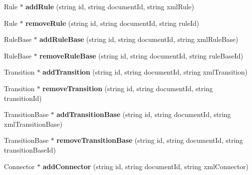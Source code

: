 \begin{CompactItemize}
\item 
Rule $\ast$ \textbf{addRule} (string id, string documentId, string xmlRule)\label{classbr_1_1pucrio_1_1telemidia_1_1ginga_1_1ncl_1_1PrivateBaseManager_79686d3529572c6b1bc7ced153141581}

\item 
Rule $\ast$ \textbf{removeRule} (string id, string documentId, string ruleId)\label{classbr_1_1pucrio_1_1telemidia_1_1ginga_1_1ncl_1_1PrivateBaseManager_5304dbb09b3486561432bc28a0765f1d}

\item 
RuleBase $\ast$ \textbf{addRuleBase} (string id, string documentId, string xmlRuleBase)\label{classbr_1_1pucrio_1_1telemidia_1_1ginga_1_1ncl_1_1PrivateBaseManager_7898de4378082126311f97e424f409e9}

\item 
RuleBase $\ast$ \textbf{removeRuleBase} (string id, string documentId, string ruleBaseId)\label{classbr_1_1pucrio_1_1telemidia_1_1ginga_1_1ncl_1_1PrivateBaseManager_7cd319df35fd4483f3f3a5ec513059cb}

\item 
Transition $\ast$ \textbf{addTransition} (string id, string documentId, string xmlTransition)\label{classbr_1_1pucrio_1_1telemidia_1_1ginga_1_1ncl_1_1PrivateBaseManager_d216f9c36ddeb8a161967a0f1110cf38}

\item 
Transition $\ast$ \textbf{removeTransition} (string id, string documentId, string transitionId)\label{classbr_1_1pucrio_1_1telemidia_1_1ginga_1_1ncl_1_1PrivateBaseManager_6abd20afd59843f960860a7ee88aa6a6}

\item 
TransitionBase $\ast$ \textbf{addTransitionBase} (string id, string documentId, string xmlTransitionBase)\label{classbr_1_1pucrio_1_1telemidia_1_1ginga_1_1ncl_1_1PrivateBaseManager_2e02df843e0c193a0db734c60b2a131b}

\item 
TransitionBase $\ast$ \textbf{removeTransitionBase} (string id, string documentId, string transitionBaseId)\label{classbr_1_1pucrio_1_1telemidia_1_1ginga_1_1ncl_1_1PrivateBaseManager_c2e27eb224730dab166f0fb29c5824c4}

\item 
Connector $\ast$ \textbf{addConnector} (string id, string documentId, string xmlConnector)\label{classbr_1_1pucrio_1_1telemidia_1_1ginga_1_1ncl_1_1PrivateBaseManager_b249e5d9cc27554192ab8c945fc8cf13}


\end{CompactItemize}
